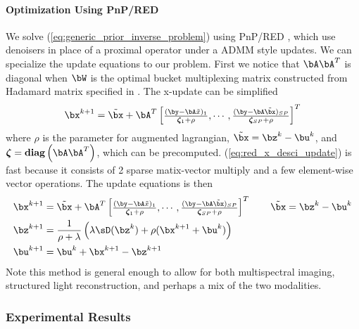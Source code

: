 \documentclass[../writeup.tex]{subfiles}
\begin{document}
\paragraph{Optimization Using PnP/RED}
We solve (\ref{eq:generic_prior_inverse_problem}) using PnP/RED \cite{venkatakrishnanPlugandPlayPriorsModel2013,romanoLittleEngineThat2016}, which use denoisers in place of a proximal operator under a ADMM style updates. We can specialize the update equations to our problem. First we notice that $\bA\bA^T$ is diagonal when $\bW$ is the optimal bucket multiplexing matrix constructed from Hadamard matrix specified in \cite{weiCodedTwoBucketCameras2018}. The x-update can be simplified  \cite{liuRankMinimizationSnapshot2019} 
\begin{align}
    \bx^{k+1} 
        = \tilde{\bx} + \bA^T \begin{bmatrix}
            \frac{(\by - \bA\tilde{x})_1}{\bzeta_1 + \rho},\cdots, \frac{(\by - \bA\tilde{\bx})_{SP}}{\bzeta_{SP} + \rho}
        \end{bmatrix}^T
    \label{eq:red_x_desci_update}
\end{align}
where $\rho$ is the parameter for augmented lagrangian, $\tilde{\bx} = \bz^k - \bu^k$, and $\bzeta = \diag \left(\bA\bA^T\right)$, which can be precomputed. (\ref{eq:red_x_desci_update}) is fast because it consists of 2 sparse matix-vector multiply and a few element-wise vector operations. The update equations is then
\begin{align} 
    \bx^{k+1}
        &= \tilde{\bx} + \bA^T \begin{bmatrix}
            \frac{(\by - \bA\tilde{x})_1}{\bzeta_1 + \rho},\cdots, \frac{(\by - \bA\tilde{\bx})_{SP}}{\bzeta_{SP} + \rho}
        \end{bmatrix}^T
        \qquad \tilde{\bx} = \bz^k - \bu^k \\
    \bz^{k+1}
        &= \frac{1}{\rho + \lambda} \left(
            \lambda \sD(\bz^{k}) + \rho ( \bx^{k+1} + \bu^k  )
        \right) \\
    \bu^{k+1}
        &= \bu^k + \bx^{k+1} - \bz^{k+1}
    \label{eq:red_admm_update_equations_fast_x_update}
\end{align}
Note this method is general enough to allow for both multispectral imaging, structured light reconstruction, and perhaps a mix of the two modalities.


\subsubsection{Experimental Results}
\end{document}
